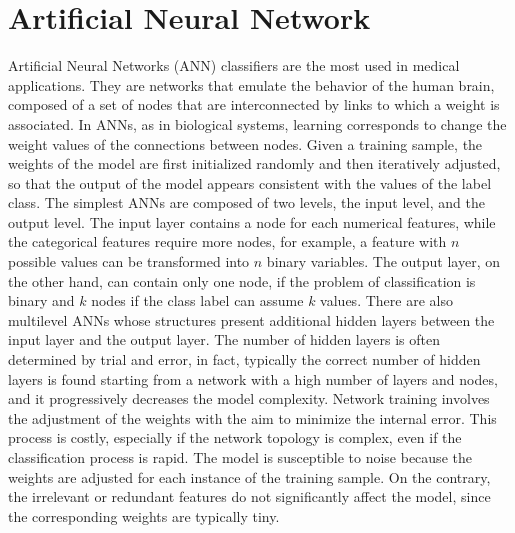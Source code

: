 \section{Artificial Neural Network} \label{ANN}
Artificial Neural Networks (\acs{ANN}) classifiers are the most used in medical applications. They are networks that emulate the behavior of the human brain, composed of a set of nodes that are interconnected by links to which a weight is associated. In ANNs, as in biological systems, learning corresponds to change the weight values of the connections between nodes. Given a training sample, the weights of the model are first initialized randomly and then iteratively adjusted, so that the output of the model appears consistent with the values of the label class. The simplest ANNs are composed of two levels, the input level, and the output level. The input layer contains a node for each numerical features, while the categorical features require more nodes, for example, a feature with $n$ possible values can be transformed into $n$ binary variables. The output layer, on the other hand, can contain only one node, if the problem of classification is binary and $k$ nodes if the class label can assume $k$ values. There are also multilevel ANNs whose structures present additional hidden layers between the input layer and the output layer. The number of hidden layers is often determined by trial and error, in fact, typically the correct number of hidden layers is found starting from a network with a high number of layers and nodes, and it progressively decreases the model complexity. Network training involves the adjustment of the weights with the aim to minimize the internal error. This process is costly, especially if the network topology is complex, even if the classification process is rapid. The model is susceptible to noise because the weights are adjusted for each instance of the training sample. On the contrary, the irrelevant or redundant features do not significantly affect the model, since the corresponding weights are typically tiny.

